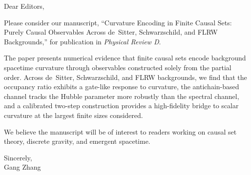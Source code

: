 \documentclass[12pt]{article}
\begin{document}
\noindent
Dear Editors,

\vspace{1em}

Please consider our manuscript, ``Curvature Encoding in Finite Causal Sets:
Purely Causal Observables Across de~Sitter, Schwarzschild, and FLRW
Backgrounds,'' for publication in \emph{Physical Review D}.

The paper presents numerical evidence that finite causal sets encode
background spacetime curvature through observables constructed solely from the
partial order. Across de~Sitter, Schwarzschild, and FLRW backgrounds, we find
that the occupancy ratio exhibits a gate-like response to curvature, the
antichain-based channel tracks the Hubble parameter more robustly than the
spectral channel, and a calibrated two-step construction provides a
high-fidelity bridge to scalar curvature at the largest finite sizes
considered.

We believe the manuscript will be of interest to readers working on causal set
theory, discrete gravity, and emergent spacetime.

\vspace{1em}

\noindent
Sincerely,\\
Gang Zhang
\end{document}
